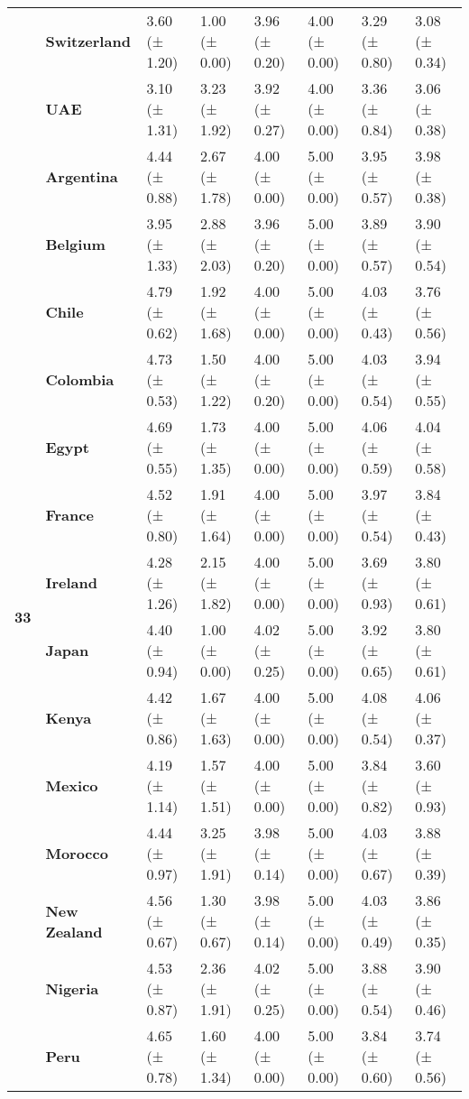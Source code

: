 \begin{tabular}{llllllll}
\textbf{} & \textbf{Switzerland} & 3.60 (± 1.20) & 1.00 (± 0.00) & 3.96 (± 0.20) & 4.00 (± 0.00) & 3.29 (± 0.80) & 3.08 (± 0.34) \\
\textbf{} & \textbf{UAE} & 3.10 (± 1.31) & 3.23 (± 1.92) & 3.92 (± 0.27) & 4.00 (± 0.00) & 3.36 (± 0.84) & 3.06 (± 0.38) \\
\cline{1-8}
\multirow[t]{19}{*}{\textbf{33}} & \textbf{Argentina} & 4.44 (± 0.88) & 2.67 (± 1.78) & 4.00 (± 0.00) & 5.00 (± 0.00) & 3.95 (± 0.57) & 3.98 (± 0.38) \\
\textbf{} & \textbf{Belgium} & 3.95 (± 1.33) & 2.88 (± 2.03) & 3.96 (± 0.20) & 5.00 (± 0.00) & 3.89 (± 0.57) & 3.90 (± 0.54) \\
\textbf{} & \textbf{Chile} & 4.79 (± 0.62) & 1.92 (± 1.68) & 4.00 (± 0.00) & 5.00 (± 0.00) & 4.03 (± 0.43) & 3.76 (± 0.56) \\
\textbf{} & \textbf{Colombia} & 4.73 (± 0.53) & 1.50 (± 1.22) & 4.00 (± 0.20) & 5.00 (± 0.00) & 4.03 (± 0.54) & 3.94 (± 0.55) \\
\textbf{} & \textbf{Egypt} & 4.69 (± 0.55) & 1.73 (± 1.35) & 4.00 (± 0.00) & 5.00 (± 0.00) & 4.06 (± 0.59) & 4.04 (± 0.58) \\
\textbf{} & \textbf{France} & 4.52 (± 0.80) & 1.91 (± 1.64) & 4.00 (± 0.00) & 5.00 (± 0.00) & 3.97 (± 0.54) & 3.84 (± 0.43) \\
\textbf{} & \textbf{Ireland} & 4.28 (± 1.26) & 2.15 (± 1.82) & 4.00 (± 0.00) & 5.00 (± 0.00) & 3.69 (± 0.93) & 3.80 (± 0.61) \\
\textbf{} & \textbf{Japan} & 4.40 (± 0.94) & 1.00 (± 0.00) & 4.02 (± 0.25) & 5.00 (± 0.00) & 3.92 (± 0.65) & 3.80 (± 0.61) \\
\textbf{} & \textbf{Kenya} & 4.42 (± 0.86) & 1.67 (± 1.63) & 4.00 (± 0.00) & 5.00 (± 0.00) & 4.08 (± 0.54) & 4.06 (± 0.37) \\
\textbf{} & \textbf{Mexico} & 4.19 (± 1.14) & 1.57 (± 1.51) & 4.00 (± 0.00) & 5.00 (± 0.00) & 3.84 (± 0.82) & 3.60 (± 0.93) \\
\textbf{} & \textbf{Morocco} & 4.44 (± 0.97) & 3.25 (± 1.91) & 3.98 (± 0.14) & 5.00 (± 0.00) & 4.03 (± 0.67) & 3.88 (± 0.39) \\
\textbf{} & \textbf{New Zealand} & 4.56 (± 0.67) & 1.30 (± 0.67) & 3.98 (± 0.14) & 5.00 (± 0.00) & 4.03 (± 0.49) & 3.86 (± 0.35) \\
\textbf{} & \textbf{Nigeria} & 4.53 (± 0.87) & 2.36 (± 1.91) & 4.02 (± 0.25) & 5.00 (± 0.00) & 3.88 (± 0.54) & 3.90 (± 0.46) \\
\textbf{} & \textbf{Peru} & 4.65 (± 0.78) & 1.60 (± 1.34) & 4.00 (± 0.00) & 5.00 (± 0.00) & 3.84 (± 0.60) & 3.74 (± 0.56) \\

\end{tabular}
